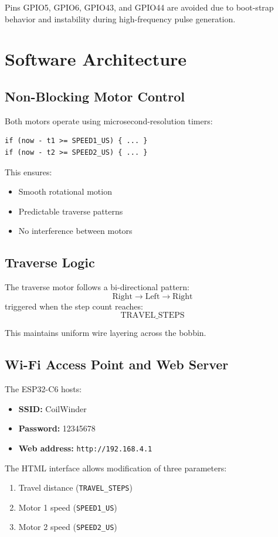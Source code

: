 \documentclass[12pt]{article}
\begin{document}
Pins GPIO5, GPIO6, GPIO43, and GPIO44 are avoided due to boot-strap behavior and instability during high-frequency pulse generation.

\section{Software Architecture}

\subsection{Non-Blocking Motor Control}

Both motors operate using microsecond-resolution timers:
\begin{verbatim}
if (now - t1 >= SPEED1_US) { ... }
if (now - t2 >= SPEED2_US) { ... }
\end{verbatim}

This ensures:
\begin{itemize}
    \item Smooth rotational motion
    \item Predictable traverse patterns
    \item No interference between motors
\end{itemize}

\subsection{Traverse Logic}

The traverse motor follows a bi-directional pattern:
\[
\text{Right} \rightarrow \text{Left} \rightarrow \text{Right}
\]
triggered when the step count reaches:
\[
\text{TRAVEL\_STEPS}
\]

This maintains uniform wire layering across the bobbin.

\subsection{Wi-Fi Access Point and Web Server}

The ESP32-C6 hosts:
\begin{itemize}
    \item \textbf{SSID:} CoilWinder
    \item \textbf{Password:} 12345678
    \item \textbf{Web address:} \texttt{http://192.168.4.1}
\end{itemize}

The HTML interface allows modification of three parameters:
\begin{enumerate}
    \item Travel distance (\texttt{TRAVEL\_STEPS})
    \item Motor 1 speed (\texttt{SPEED1\_US})
    \item Motor 2 speed (\texttt{SPEED2\_US})
\end{enumerate}
\end{document}
